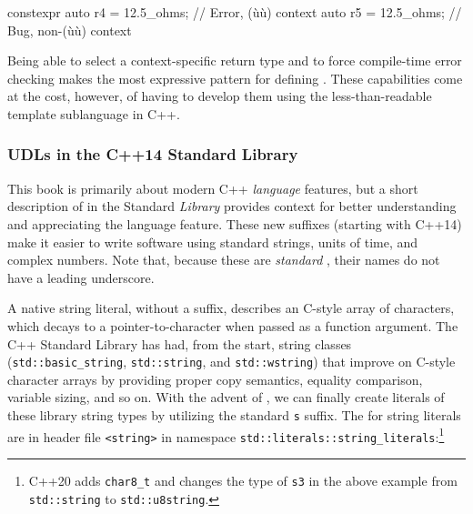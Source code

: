 \begin{emcppslisting}[emcppsbatch=e12]
constexpr auto r4 = 12.5_ohms;  // Error, (ù{}ù) context
          auto r5 = 12.5_ohms;  // Bug, non-(ù{}ù) context
\end{emcppslisting}
    
\noindent Being able to select a context-specific return type and to force
compile-time error checking makes  the
most expressive pattern for defining . These
capabilities come at the cost, however, of having to develop them using
the less-than-readable template sublanguage in C++.

\subsubsection[UDLs in the C++14 Standard Library]{UDLs in the C++14 Standard Library}\label{udls-in-the-c++14-standard-library}

This book is primarily about modern C++ \emph{language} features, but a
short description of  in the Standard
\emph{Library} provides context for better understanding and
appreciating the  language feature. These new suffixes
(starting with C++14) make it easier to write software using standard
strings, units of time, and complex numbers. Note that, because these
are \emph{standard} , their names do not have a
leading underscore.

A native string literal, without a suffix, describes an C-style array of
characters, which decays to a pointer-to-character when passed as a
function argument. The C++ Standard Library has had, from the start,
string classes (\lstinline!std::basic_string!, \lstinline!std::string!, and
\lstinline!std::wstring!) that improve on C-style character arrays by
providing proper copy semantics, equality comparison, variable sizing,
and so on. With the advent of , we can finally create
literals of these library string types by utilizing the standard
\lstinline!s! suffix. The  for string literals are in
header file \lstinline!<string>! in namespace\linebreak%
\lstinline!std::literals::string_literals!:{\cprotect\footnote{C++20 adds \lstinline!char8_t!
and changes the type of \lstinline!s3! in the above example from \lstinline!std::string! to
\lstinline!std::u8string!.}}

